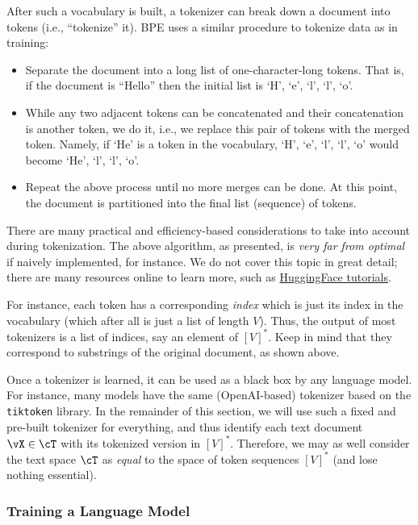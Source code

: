 \documentclass[../../book-main.tex]{subfiles}
\begin{document}
After such a vocabulary is built, a tokenizer can break down a
document into tokens (i.e., ``tokenize'' it). BPE uses a similar
procedure to tokenize data as in training:
\begin{itemize}
\item Separate the document into a long list of one-character-long
tokens. That is, if the document is ``Hello'' then the initial
list is `H', `e', `l', `l', `o'.
\item While any two adjacent tokens can be concatenated and their
concatenation is another token, we do it, i.e., we replace this
pair of tokens with the merged token. Namely, if `He' is a token
in the vocabulary, `H', `e', `l', `l', `o' would become `He', `l', `l', `o'.
\item Repeat the above process until no more merges can be done. At
this point, the document is partitioned into the final list
(sequence) of tokens.
\end{itemize}

There are many practical and efficiency-based considerations to take
into account during tokenization. The above algorithm, as presented,
is \textit{very far from optimal} if naively implemented, for
instance. We do not cover this topic in great detail; there are many
resources online to learn more, such as
\href{https://huggingface.co/learn/nlp-course/en/chapter6/5}{HuggingFace
tutorials}.

For instance, each token has a corresponding \textit{index} which is
just its index in the vocabulary (which after all is just a list of
length \(V\)). Thus, the output of most tokenizers is a list of
indices, say an element of \([V]^{*}\). Keep in mind that they
correspond to substrings of the original document, as shown above.

Once a tokenizer is learned, it can be used as a black box by any
language model. For instance, many models have the same
(OpenAI-based) tokenizer based on the \texttt{tiktoken} library. In
the remainder of this section, we will use such a fixed and pre-built
tokenizer for everything, and thus identify each text document \(\vX
\in \cT\) with its tokenized version in \([V]^{*}\). Therefore, we
may as well consider the text space \(\cT\) as \textit{equal} to the
space of token sequences \([V]^{*}\) (and lose nothing essential).

\subsubsection{Training a Language Model}
\end{document}

